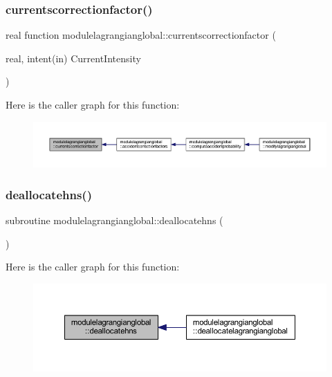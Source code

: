 \subsubsection{\texorpdfstring{currentscorrectionfactor()}{currentscorrectionfactor()}}
{\footnotesize\ttfamily real function modulelagrangianglobal\+::currentscorrectionfactor (\begin{DoxyParamCaption}\item[{real, intent(in)}]{Current\+Intensity }\end{DoxyParamCaption})\hspace{0.3cm}{\ttfamily [private]}}

Here is the caller graph for this function\+:\nopagebreak
\begin{figure}[H]
\begin{center}
\leavevmode
\includegraphics[width=350pt]{namespacemodulelagrangianglobal_ad3e36abc135e62fb5fb1583ea3acf79b_icgraph}
\end{center}
\end{figure}
\mbox{\label{namespacemodulelagrangianglobal_a34137a5604bf2312cac012e0415fdb9f}} 
\subsubsection{\texorpdfstring{deallocatehns()}{deallocatehns()}}
{\footnotesize\ttfamily subroutine modulelagrangianglobal\+::deallocatehns (\begin{DoxyParamCaption}{ }\end{DoxyParamCaption})\hspace{0.3cm}{\ttfamily [private]}}

Here is the caller graph for this function\+:\nopagebreak
\begin{figure}[H]
\begin{center}
\leavevmode
\includegraphics[width=350pt]{namespacemodulelagrangianglobal_a34137a5604bf2312cac012e0415fdb9f_icgraph}
\end{center}
\end{figure}
\mbox{\label{namespacemodulelagrangianglobal_a8fa9aff34dfeede08953dd200b17e64b}} 
